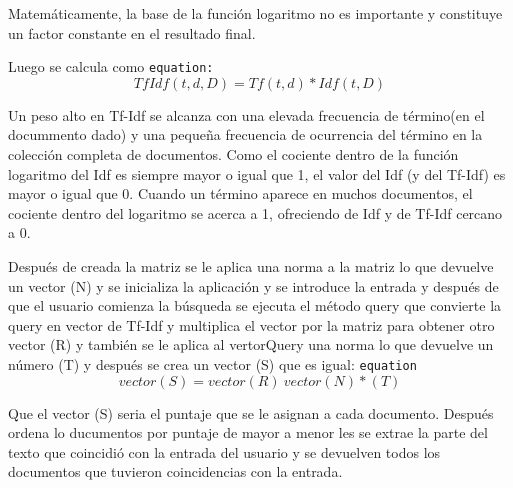 \documentclass[spanish,10pt,a4paper]{article}
\begin{document}
     Matemáticamente, la base de la función logaritmo no es importante y constituye un factor constante en el resultado final.
     
     Luego se calcula como \texttt{equation:}
     \begin{equation}\label{eq:TfIdf}
     	TfIdf(t,d,D) = Tf(t,d) * Idf(t,D)
     \end{equation}
     
     Un peso alto en Tf-Idf se alcanza con una elevada frecuencia de término(en el docummento dado) y una pequeña frecuencia de ocurrencia del término en la colección completa de documentos. Como el cociente dentro de la función logaritmo del Idf es siempre mayor o igual que 1, el valor del Idf (y del Tf-Idf) es mayor o igual que 0. Cuando un término aparece en muchos documentos, el cociente dentro del logaritmo se acerca a 1, ofreciendo de Idf y de Tf-Idf cercano a 0.
     
     
     Después de creada la matriz se le aplica una norma a la matriz lo que devuelve un vector (N) y se inicializa la aplicación y se introduce la entrada y después de que el usuario comienza la búsqueda se ejecuta el método query que convierte la query en vector de Tf-Idf y multiplica el vector por la matriz para obtener otro vector (R) y también se le aplica al vertorQuery una norma lo que devuelve un número (T) y después se crea un  vector (S) que es igual: \texttt{equation}
     \begin{equation}
     	vector (S) = vector (R)\ vector (N)*(T)
     \end{equation}
     
     Que el vector (S) seria el puntaje que se le asignan a cada documento. Después ordena lo ducumentos por puntaje de mayor a menor les se extrae la parte del texto que coincidió con la entrada del usuario y se devuelven todos los documentos que tuvieron coincidencias con la entrada.
      
      
     
     \newpage
     \tableofcontents
     
        	
\end{document}
